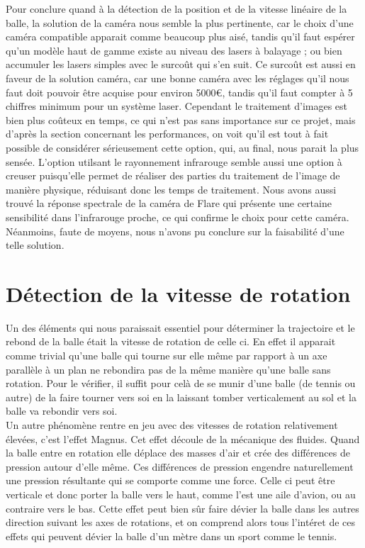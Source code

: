 Pour conclure quand à la détection de la position et de la vitesse linéaire de la balle, la solution de la caméra nous semble la plus pertinente, car le choix d'une caméra compatible apparait comme beaucoup plus aisé, tandis qu'il faut espérer qu'un modèle haut de gamme existe au niveau des lasers à balayage ; ou bien accumuler les lasers simples avec le surcoût qui s'en suit. Ce surcoût est aussi en faveur de la solution caméra, car une bonne caméra avec les réglages qu'il nous faut doit pouvoir être acquise pour environ 5000€, tandis qu'il faut compter à 5 chiffres minimum pour un système laser. Cependant le traitement d'images est bien plus coûteux en temps, ce qui n'est pas sans importance sur ce projet, mais d'après la section concernant les performances, on voit qu'il est tout à fait possible de considérer sérieusement cette option, qui, au final, nous parait la plus sensée. L'option utilsant le rayonnement infrarouge semble aussi une option à creuser puisqu'elle permet de réaliser des parties du traitement de l'image de manière physique, réduisant donc les temps de traitement. Nous avons aussi trouvé la réponse spectrale de la caméra de Flare qui présente une certaine sensibilité dans l'infrarouge proche, ce qui confirme le choix pour cette caméra. Néanmoins, faute de moyens, nous n'avons pu conclure sur la faisabilité d'une telle solution.




\section{Détection de la vitesse de rotation}

Un des éléments qui nous paraissait essentiel pour déterminer la trajectoire et le rebond de la balle était la vitesse de rotation de celle ci. En effet il apparait comme trivial qu'une balle qui tourne sur elle même par rapport à un axe parallèle à un plan ne rebondira pas de la même manière qu'une balle sans rotation. Pour le vérifier, il suffit pour celà de se munir d'une balle (de tennis ou autre) de la faire tourner vers soi en la laissant tomber verticalement au sol et la balle va rebondir vers soi.\\

Un autre phénomène rentre en jeu avec des vitesses de rotation relativement élevées, c'est l'effet Magnus. Cet effet découle de la mécanique des fluides. Quand la balle entre en rotation elle déplace des masses d'air et crée des différences de pression autour d'elle même. Ces différences de pression engendre naturellement une pression résultante qui se comporte comme une force. Celle ci peut être verticale et donc porter la balle vers le haut, comme l'est une aile d'avion, ou au contraire vers le bas. Cette effet peut bien sûr faire dévier la balle dans les autres direction suivant les axes de rotations, et on comprend alors tous l'intéret de ces effets qui peuvent dévier la balle d'un mètre dans un sport comme le tennis.\\

